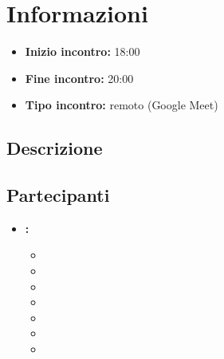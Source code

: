 \section{Informazioni}
\begin{itemize}
	\item \textbf{Inizio incontro:} 18:00
	\item \textbf{Fine incontro:} 20:00
	\item \textbf{Tipo incontro:} remoto (Google Meet)
\end{itemize}

\subsection{Descrizione}
\DocDescription

\subsection{Partecipanti}

\begin{itemize}
	\item \textbf{\GroupName:}
	\begin{itemize}
		\item \tommaso
		\item \marco
		\item \raul
		\item \sebastiano
		\item \mattia
		\item \martina
		\item \riccardo
	\end{itemize}
\end{itemize}

\clearpage
